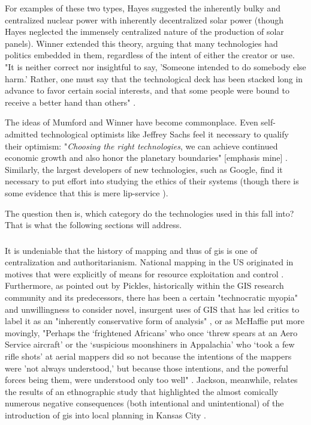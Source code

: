For examples of these two types, Hayes suggested the inherently bulky and centralized nuclear power with inherently decentralized solar power \cite{hayesRaysHopeTransition1977} (though Hayes neglected the immensely centralized nature of the production of solar panels). Winner extended this theory, arguing that many technologies had politics embedded in them, regardless of the intent of either the creator or use. "It is neither correct nor insightful to say, 'Someone intended to do somebody else harm.' Rather, one must say that the technological deck has been stacked long in advance to favor certain social interests, and that some people were bound to receive a better hand than others" \cite{winnerArtifactsHavePolitics1980}.

The ideas of Mumford and Winner have become commonplace. Even self-admitted technological optimists like Jeffrey Sachs \cite{sachsOptimismNewYear2021} feel it necessary to qualify their optimism: "\textit{Choosing the right technologies}, we can achieve continued economic growth and also honor the planetary boundaries" [emphasis mine] \cite{sachsAgeSustainableDevelopment2015}. Similarly, the largest developers of new technologies, such as Google, find it necessary to put effort into studying the ethics of their systems (though there is some evidence that this is mere lip-service \cite{simoniteWhatReallyHappened}). 

The question then is, which category do the technologies used in this fall into? That is what the following sections will address.

\subsubsection{} \label{sec:mapping_critique}

It is undeniable that the history of mapping and thus of \ac{gis} is one of centralization and authoritarianism. National mapping in the US originated in motives that were explicitly of means for resource exploitation and control \cite{mchaffieManufacturingMetaphors1994}. Furthermore, as pointed out by Pickles, historically within the GIS research community and its predecessors, there has been a certain "technocratic myopia" and unwillingness to consider novel, insurgent uses of GIS that has led critics to label it as an "inherently conservative form of analysis" \cite{picklesRepresentationsElectronicAge1994}, or as McHaffie put more movingly, "Perhaps the `frightened Africans' who once `threw spears at an Aero Service aircraft' or the `suspicious moonshiners in Appalachia' who `took a few rifle shots' at aerial mappers did so not because the intentions of the mappers were 'not always understood,' but because those intentions, and the powerful forces being them, were understood only too well" \cite{mchaffieManufacturingMetaphors1994}. Jackson, meanwhile, relates the results of an ethnographic study that highlighted the almost comically numerous negative consequences (both intentional and unintentional) of the introduction of \ac{gis} into local planning in Kansas City \cite{jacksonCityThirtyThousand2008}.

